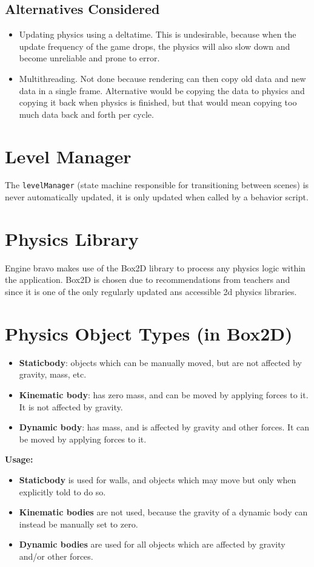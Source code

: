 \documentclass[draft]{article}
\begin{document}
\subsection{Alternatives Considered}
\begin{itemize}
  \item Updating physics using a deltatime. This is undesirable, because when the update frequency of the game drops, the physics will also slow down and become unreliable and prone to error.
  \item Multithreading. Not done because rendering can then copy old data and new data in a single frame. Alternative would be copying the data to physics and copying it back when physics is finished, but that would mean copying too much data back and forth per cycle.
\end{itemize}

\section{Level Manager}
The \texttt{levelManager} (state machine responsible for transitioning between scenes) is never automatically updated, it is only updated when called by a behavior script.

\section{Physics Library}
Engine bravo makes use of the Box2D library to process any physics logic within the application. Box2D is chosen due to recommendations from teachers and since it is one of the only regularly updated ans accessible 2d physics libraries. 

\section{Physics Object Types (in Box2D)}
\begin{itemize}
  \item \textbf{Staticbody}: objects which can be manually moved, but are not affected by gravity, mass, etc.
  \item \textbf{Kinematic body}: has zero mass, and can be moved by applying forces to it. It is not affected by gravity.
  \item \textbf{Dynamic body}: has mass, and is affected by gravity and other forces. It can be moved by applying forces to it.
\end{itemize}

\noindent
\textbf{Usage:}
\begin{itemize}
  \item \textbf{Staticbody} is used for walls, and objects which may move but only when explicitly told to do so.
  \item \textbf{Kinematic bodies} are not used, because the gravity of a dynamic body can instead be manually set to zero.
  \item \textbf{Dynamic bodies} are used for all objects which are affected by gravity and/or other forces.
\end{itemize}
\end{document}
